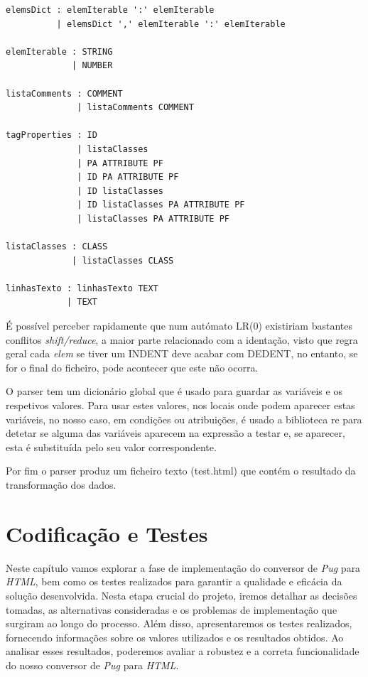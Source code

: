 \documentclass[11pt,a4paper]{report}%
\begin{document}
\begin{verbatim}
elemsDict : elemIterable ':' elemIterable
          | elemsDict ',' elemIterable ':' elemIterable
          
elemIterable : STRING
             | NUMBER
             
listaComments : COMMENT
              | listaComments COMMENT
              
tagProperties : ID
              | listaClasses
              | PA ATTRIBUTE PF
              | ID PA ATTRIBUTE PF
              | ID listaClasses
              | ID listaClasses PA ATTRIBUTE PF
              | listaClasses PA ATTRIBUTE PF
              
listaClasses : CLASS
             | listaClasses CLASS
             
linhasTexto : linhasTexto TEXT
            | TEXT
\end{verbatim}


É possível perceber rapidamente que num autómato LR(0) existiriam bastantes conflitos \textit{shift/reduce}, a maior parte relacionado com a identação, visto que regra geral cada \textit{elem} se tiver um INDENT deve acabar com DEDENT, no entanto, se for o final do ficheiro, pode acontecer que este não ocorra.



O parser tem um dicionário global que é usado para guardar as variáveis e os respetivos valores. Para usar estes valores, nos locais onde podem aparecer estas variáveis, no nosso caso, em condições ou atribuições, é usado a biblioteca re para detetar se alguma das variáveis aparecem na expressão a testar e, se aparecer, esta é substituída pelo seu valor correspondente.

Por fim o parser produz um ficheiro texto (test.html) que contém o resultado da transformação dos dados.






\chapter{Codificação e Testes}
Neste capítulo vamos explorar a fase de implementação do conversor de \textit{Pug} para \textit{HTML}, bem como os testes realizados para garantir a qualidade e eficácia da solução desenvolvida. Nesta etapa crucial do projeto, iremos detalhar as decisões tomadas, as alternativas consideradas e os problemas de implementação que surgiram ao longo do processo. Além disso, apresentaremos os testes realizados, fornecendo informações sobre os valores utilizados e os resultados obtidos. Ao analisar esses resultados, poderemos avaliar a robustez e a correta funcionalidade do nosso conversor de \textit{Pug} para \textit{HTML}.
\end{document}
